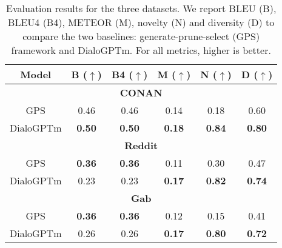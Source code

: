 \newpage
\begin{table}[!htpb]
\centering
\scriptsize
\begin{tabular}{|c|c|c|c|c|c|}
\hline
Model & B ($\uparrow$) & B4 ($\uparrow$) & M ($\uparrow$) & N ($\uparrow$) & D ($\uparrow$)\\
\hline
\multicolumn{6}{|c|}{\textbf{CONAN}}                                   \\ \hline

GPS & 0.46 & 0.46 & 0.14  & 0.18 & 0.60  \\
DialoGPTm & \textbf{0.50}& \textbf{0.50}& \textbf{0.18} &\textbf{ 0.84} & \textbf{0.80} \\\hline

\multicolumn{6}{|c|}{\textbf{Reddit}}                                   \\ \hline

 GPS & \textbf{0.36} & \textbf{0.36} & 0.11 & 0.30 & 0.47  \\
 DialoGPTm & 0.23 & 0.23 & \textbf{0.17} & \textbf{0.82} & \textbf{0.74} \\\hline

\multicolumn{6}{|c|}{\textbf{Gab}}                                   \\ \hline
           

GPS & \textbf{0.36 }& \textbf{0.36} & 0.12 & 0.15  & 0.41 \\
DialoGPTm & 0.26 & 0.26 & \textbf{0.17} & \textbf{0.80} & \textbf{0.72} \\
\hline
\end{tabular}
\caption{\scriptsize{Evaluation results for the three datasets. We report BLEU (B), BLEU4 (B4), METEOR (M), novelty (N) and diversity (D) to compare the two baselines: generate-prune-select (GPS) framework and DialoGPTm. For all metrics, higher is better.}}
\label{tab:results-accurate}
\end{table}

